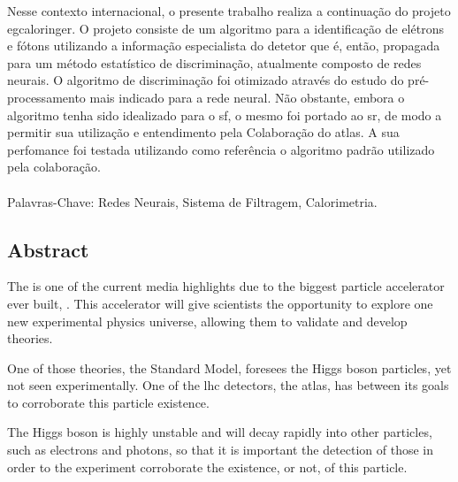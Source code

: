 Nesse contexto internacional, o presente trabalho realiza a continuação
do projeto \acrshort{egcaloringer}. O projeto consiste de um algoritmo 
para a identificação de elétrons e fótons utilizando a informação especialista 
do detetor que é, então, propagada para um método estatístico de discriminação, 
atualmente composto de redes neurais. O algoritmo de discriminação foi otimizado 
através do estudo do pré-processamento mais indicado para a rede neural. 
Não obstante, embora o algoritmo tenha sido idealizado para o \gls{sf}, 
o mesmo foi portado ao \gls{sr}, de modo a permitir sua utilização e 
entendimento pela Colaboração do \acrshort{atlas}. A sua perfomance foi 
testada utilizando como referência o algoritmo padrão utilizado 
pela colaboração.

\paragraph*{}

\noindent Palavras-Chave: Redes Neurais, Sistema de Filtragem, Calorimetria.

\vfill

\cleardoublepage

\vfill
\begin{center}
\section*{Abstract\label{Abstract}}
\end{center}


The  is one of the current
media highlights due to the biggest particle accelerator ever built, . This accelerator will give scientists the opportunity to explore 
one new experimental physics universe, allowing them to validate and develop
theories.

One of those theories, the Standard Model, foresees the Higgs boson particles,
yet not seen experimentally. One of the \acrshort{lhc} detectors, the
\gls{atlas}, has between its goals to corroborate this particle existence.

The Higgs boson is highly unstable and will decay rapidly into other particles,
such as electrons and photons, so that it is important the detection of those in 
order to the experiment corroborate the existence, or not, of this particle.

